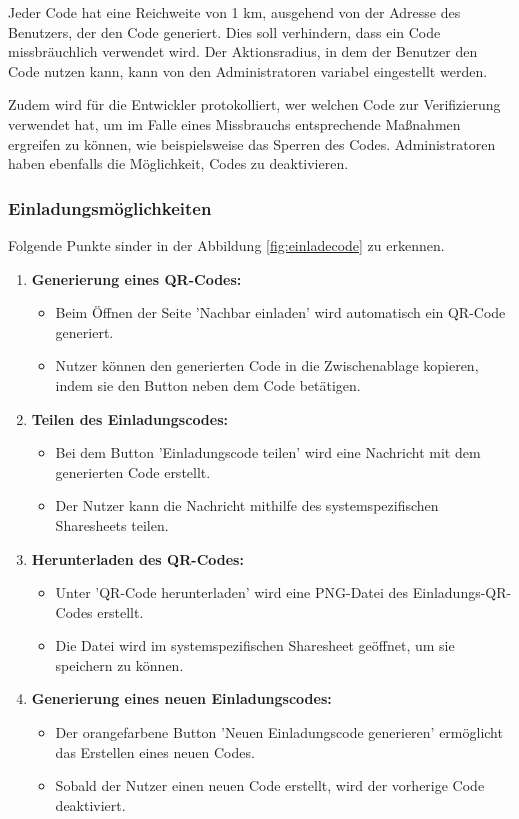 Jeder Code hat eine Reichweite von 1 km, ausgehend von der Adresse des Benutzers, der den Code generiert. Dies soll verhindern, dass ein Code missbräuchlich verwendet wird. Der Aktionsradius, in dem der Benutzer den Code nutzen kann, kann von den Administratoren variabel eingestellt werden.

Zudem wird für die Entwickler protokolliert, wer welchen
Code zur Verifizierung verwendet hat, um im Falle eines
Missbrauchs entsprechende Maßnahmen ergreifen zu können, wie
beispielsweise das Sperren des Codes. Administratoren haben
ebenfalls die Möglichkeit, Codes zu deaktivieren.
\subsubsection{Einladungsmöglichkeiten}


Folgende Punkte sinder in der Abbildung
\ref{fig:einladecode} zu erkennen.


\begin{enumerate}[label=\arabic*.]
  \item \textbf{Generierung eines QR-Codes:}
        \begin{itemize}
          \item Beim Öffnen der Seite 'Nachbar einladen' wird automatisch ein QR-Code generiert.
          \item Nutzer können den generierten Code in die Zwischenablage kopieren, indem sie den Button neben dem Code betätigen.
        \end{itemize}

  \item \textbf{Teilen des Einladungscodes:}
        \begin{itemize}
          \item Bei dem Button 'Einladungscode teilen' wird eine Nachricht mit dem generierten Code erstellt.
          \item Der Nutzer kann die Nachricht mithilfe des systemspezifischen Sharesheets teilen.
        \end{itemize}

  \item \textbf{Herunterladen des QR-Codes:}
        \begin{itemize}
          \item Unter 'QR-Code herunterladen' wird eine PNG-Datei des Einladungs-QR-Codes erstellt.
          \item Die Datei wird im systemspezifischen Sharesheet geöffnet, um sie speichern zu können.
        \end{itemize}

  \item \textbf{Generierung eines neuen Einladungscodes:}
        \begin{itemize}
          \item Der orangefarbene Button 'Neuen Einladungscode generieren' ermöglicht das Erstellen eines neuen Codes.
          \item Sobald der Nutzer einen neuen Code erstellt, wird der vorherige Code deaktiviert.
        \end{itemize}
\end{enumerate}

